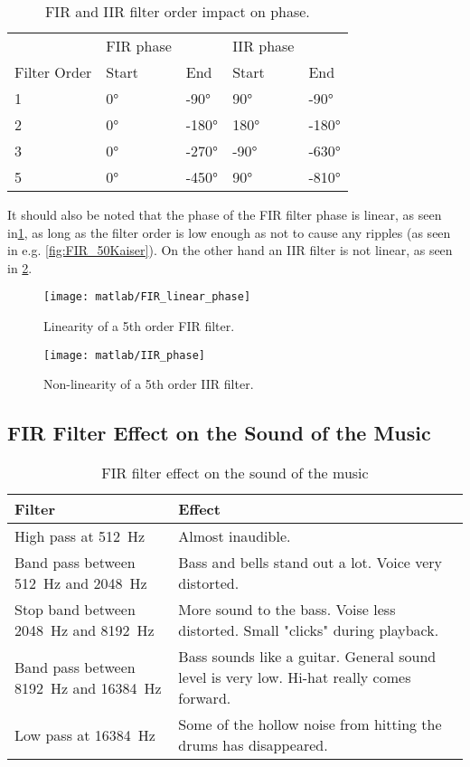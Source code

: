 \begin{table}[!htb]
	\caption{FIR and IIR filter order impact on phase.}
	\label{tab:phase}
	\begin{tabularx}{\textwidth}{X | X X | X X}
		& FIR phase & & IIR phase & \\
		Filter Order & Start & End & Start & End \\
		\midrule
		1 & \ang{0} & \ang{-90} & \ang{90} & \ang{-90} \\
		2 & \ang{0} & \ang{-180} & \ang{180} & \ang{-180} \\
		3 & \ang{0} & \ang{-270} & \ang{-90} & \ang{-630} \\
		5 & \ang{0} & \ang{-450} & \ang{90} & \ang{-810} \\
	\end{tabularx}
\end{table}

It should also be noted that the phase of the FIR filter phase is linear, as seen in\cref{fig:FIR_linearphase}, as long as the filter order is low enough as not to cause any ripples (as seen in e.g. \cref{fig:FIR_50Kaiser}). On the other hand an IIR filter is not linear, as seen in \cref{fig:IIR_phase}.

\begin{figure}
	\centering
	\texttt{[image: matlab/FIR\_linear\_phase]}
	\caption{Linearity of a 5th order FIR filter.}
	\label{fig:FIR_linearphase}
\end{figure}

\begin{figure}
	\centering
	\texttt{[image: matlab/IIR\_phase]}
	\caption{Non-linearity of a 5th order IIR filter.}
	\label{fig:IIR_phase}
\end{figure}
	
\subsection{FIR Filter Effect on the Sound of the Music}
\begin{table}[!htb]
	\caption{FIR filter effect on the sound of the music}
	\label{tab:music}
	\begin{tabularx}{\textwidth}{X X}
		Filter & Effect \\
		\midrule
		High pass at \SI{512}{\hertz} & Almost inaudible. \\
		Band pass between \SI{512}{\hertz} and \SI{2048}{\hertz} & Bass and bells stand out a lot. Voice very distorted.\\
		Stop band between \SI{2048}{\hertz} and \SI{8192}{\hertz} & More sound to the bass. Voise less distorted. Small "clicks" during playback. \\
		Band pass between \SI{8192}{\hertz} and \SI{16384}{\hertz} & Bass sounds like a guitar. General sound level is very low. Hi-hat really comes forward.\\
		Low pass at \SI{16384}{\hertz} & Some of the hollow noise from hitting the drums has disappeared.\\
	\end{tabularx}
\end{table}
